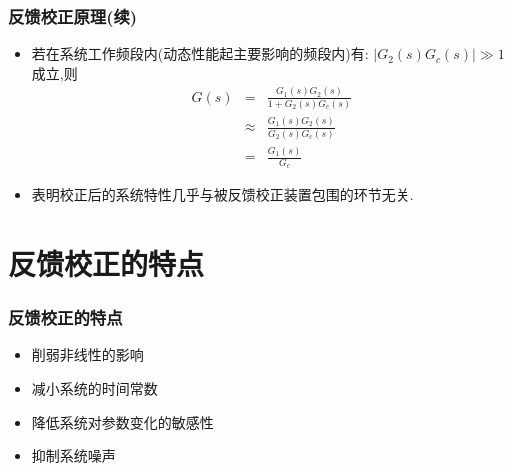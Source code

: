 \documentclass[table]{beamer}
\begin{document}
\begin{frame}
\frametitle{反馈校正原理(续)}
\label{sec-1-2}


\begin{itemize}
\item 若在系统工作频段内(动态性能起主要影响的频段内)有:  $|G_2(s)G_c(s)|\gg 1$  成立,则
      \begin{eqnarray*}
      G(s) & = &\frac{G_1(s)G_2(s)}{1+G_2(s)G_c(s)} \\
           &\approx& \frac{G_1(s)G_2(s)}{G_2(s)G_c(s)}\\ 
           &=& \frac{G_1(s)}{G_c}
      \end{eqnarray*}
\item <2->表明校正后的系统特性几乎与被反馈校正装置包围的环节无关.
\end{itemize}

\end{frame}
\section{反馈校正的特点}
\label{sec-2}
\begin{frame}
\frametitle{反馈校正的特点}
\label{sec-2-1}

\begin{itemize}
\item <2->削弱非线性的影响
\item <3->减小系统的时间常数
\item <4->降低系统对参数变化的敏感性
\item <5->抑制系统噪声
\end{itemize}
\end{frame}
\end{document}
